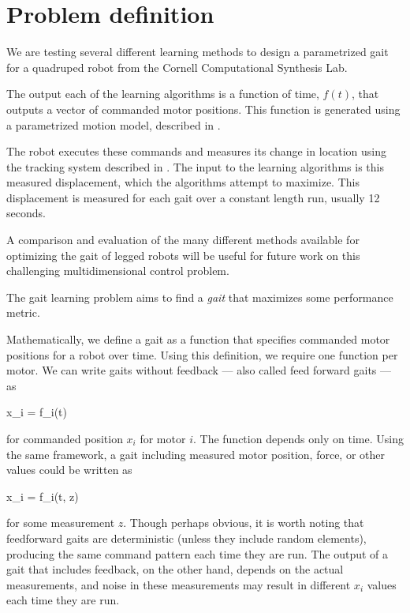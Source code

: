 \section{Problem definition}


We are testing several different learning methods to design a
parametrized gait for a quadruped robot from the Cornell Computational
Synthesis Lab.

The output each of the learning algorithms is a function of time,
$f(t)$, that outputs a vector of commanded motor positions.  This
function is generated using a parametrized motion model, described in
.

The robot executes these commands and measures its change in location
using the tracking system described in .  The input
to the learning algorithms is this measured displacement, which the
algorithms attempt to maximize. This displacement is measured for each
gait over a constant length run, usually 12 seconds.

A comparison and evaluation of the many different methods available
for optimizing the gait of legged robots will be useful for future
work on this challenging multidimensional control problem.




The gait learning problem aims to find a \emph{gait} that maximizes
some performance metric.

Mathematically, we define a gait as a function that specifies
commanded motor positions for a robot over time.  Using this
definition, we require one function per motor.  We can write gaits
without feedback --- also called feed forward gaits --- as

\be
x_i = f_i(t)
\ee

\noindent for commanded position $x_i$ for motor $i$.  The
function depends only on time.  Using the same framework, a gait
including measured motor position, force, or other values could be
written as

\be
x_i = f_i(t, z)
\ee

\noindent for some measurement $z$.  Though perhaps obvious, it is
worth noting that feedforward gaits are deterministic (unless they
include random elements), producing the same command pattern each time
they are run.  The output of a gait that includes feedback, on the
other hand, depends on the actual measurements, and noise in these
measurements may result in different $x_i$ values each time they are
run.

